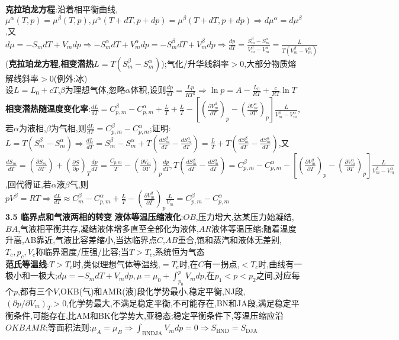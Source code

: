 \documentclass[10pt,a4paper]{article}
\begin{document}
\begin{multicols}{2}
\textbf{克拉珀龙方程}:沿着相平衡曲线,$\mu^{\alpha}(T,p)=\mu^{\beta}(T,p),\mu^{\alpha}(T+dT,p+dp)=\mu^{\beta}(T+dT,p+dp)\Rightarrow d\mu^{\alpha}=d\mu^{\beta}$,又$d\mu=-S_mdT+V_mdp\Rightarrow-S_m^{\alpha}dT+V_m^{\alpha}dp=-S_m^{\beta}dT+V_m^{\beta}dp\Rightarrow\frac{dp}{dT}=\frac{S_m^{\beta}-S_m^{\alpha}}{V_m^{\beta}-V_m^{\alpha}}=\frac{L}{T(V_m^{\beta}-V_m^{\alpha})}$(\textbf{克拉珀龙方程},\textbf{相变潜热}$L=T(S_m^{\beta}-S_m^{\alpha})$);气化/升华线斜率$>0$,大部分物质熔解线斜率$>0$(例外:冰)\\
设$L=L_0+cT$,$\beta$为理想气体,忽略$\alpha$体积,设则$\frac{dp}{dT}=\frac{Lp}{RT^2}\Rightarrow\ln p=A-\frac{L_0}{RT}+\frac{c}{RT}\ln T$\\
\textbf{相变潜热随温度变化率}:$\frac{dL}{dT}=C_{p,m}^{\beta}-C_{p,m}^{\alpha}+\frac{L}{T}+\frac{L}{T}-\left[\left(\frac{\partial V_m^{\beta}}{\partial T}\right)_p-\left(\frac{\partial V_m^{\alpha}}{\partial T}\right)_p\right]\frac{L}{V_m^{\beta}-V_m^{\alpha}}$,若$\alpha$为液相,$\beta$为气相,则$\frac{dL}{dT}=C_{p,m}^{\beta}-C_{p,m}^{\alpha}$;证明:$L=T(S_m^{\beta}-S_m^{\alpha})\Rightarrow\frac{dL}{dT}=S_m^{\beta}-S_m^{\alpha}+T\left(\frac{dS_m^{\beta}}{dT}-\frac{dS_m^{\alpha}}{dT}\right)=\frac{L}{T}+T\left(\frac{dS_m^{\beta}}{dT}-\frac{dS_m^{\alpha}}{dT}\right)$,又$\frac{dS_m}{dT}=\left(\frac{\partial S_m}{\partial T}\right)+\left(\frac{\partial S}{\partial p}\right)_T\frac{dp}{dT}=\frac{C_{p,m}}{T}-\left(\frac{\partial V_m}{\partial T}\right)_p\frac{dp}{dT},T\left(\frac{dS_m^{\beta}}{dT}-\frac{dS_m^{\alpha}}{dT}\right)=C_{p,m}^{\beta}-C_{p,m}^{\alpha}-\left[\left(\frac{\partial V_m^{\beta}}{\partial T}\right)_p-\left(\frac{\partial V_m^{\alpha}}{\partial T}\right)_p\right]\frac{L}{V_m^{\beta}-V_m^{\alpha}}$,回代得证,若$\alpha$液$\beta$气,则$pV^{\beta}=RT\Rightarrow\frac{dL}{dT}\approx C_m^{\beta}-C_{p,m}^{\alpha}+\frac{L}{T}-\left(\frac{\partial V_m^{\beta}}{\partial T}\right)_p\frac{L}{V_m}=C_{p,m}^{\beta}-C_{p,m}^{\alpha}$\\
\textbf{3.5 临界点和气液两相的转变}
\textbf{液体等温压缩液化}:$OB$,压力增大,达某压力始凝结,$BA$,气液相平衡共存,凝结液体增多直至全部化为液体,$AR$液体等温压缩;随着温度升高,AB靠近,气液比容差缩小,当达临界点$C$,$AB$重合,饱和蒸汽和液体无差别,$T_c,p_c,V_c$称临界温度/压强/比容;当$T>T_c$,系统恒为气态\\
\textbf{范氏等温线}:$T>T_c$时,类似理想气体等温线,$=T_c$时,在$C$有一拐点,$<T_c$时,曲线有一极小和一极大;$d\mu=-S_mdT+V_mdp,\mu=\mu_0+\int_{p_0}^pV_mdp$,在$p_1<p<p_2$之间,对应每个$p$,都有三个$V$,OKB(气)和AMR(液)段化学势最小,稳定平衡,NJ段,$(\partial p/\partial V_m)_T>0$,化学势最大,不满足稳定平衡,不可能存在,BN和JA段,满足稳定平衡条件,可能存在,比AM和BK化学势大,亚稳态;稳定平衡条件下,等温压缩应沿$OKBAMR$;等面积法则:$\mu_A=\mu_B\Rightarrow\int_{\text{BNDJA}}V_mdp=0\Rightarrow S_{\text{BND}}=S_{\text{DJA}}$\\

\end{multicols}
\end{document}
